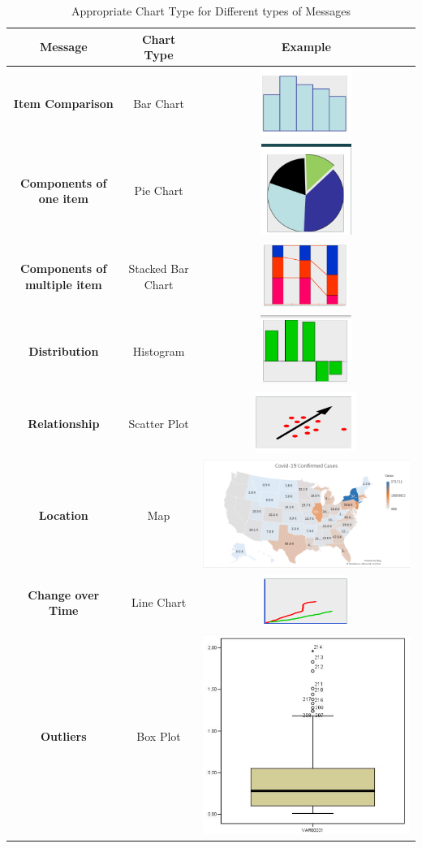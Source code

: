 \documentclass[11pt,fleqn]{book} %
\begin{document}
\begin{example}
\begin{table}[htb!]
  \centering
  \begin{tabular}{|c|c|c|}
    \hline
    \textbf{Message} & \textbf{Chart Type} & \textbf{Example} \\
    \hline
    \textbf{Item Comparison} & Bar Chart
    & \includegraphics[width=0.1\linewidth]{Pictures/small-bar.png} \\
    \hline
    \textbf{Components of one item} & Pie Chart
    & \includegraphics[width=0.1\linewidth]{Pictures/small-pie.png} \\
    \hline
    \textbf{Components of multiple item} & Stacked Bar Chart
    & \includegraphics[width=0.1\linewidth]{Pictures/small-stacked-bar.png} \\
    \hline
    \textbf{Distribution} & Histogram
    & \includegraphics[width=0.1\linewidth]{Pictures/small-histogram.png} \\
    \hline
    \textbf{Relationship} & Scatter Plot
    & \includegraphics[width=0.1\linewidth]{Pictures/small-scatter.png} \\
    \hline
    \textbf{Location} & Map
    & \includegraphics[width=0.1\linewidth]{Pictures/small-map.png} \\
    \hline
    \textbf{Change over Time} & Line Chart
    & \includegraphics[width=0.1\linewidth]{Pictures/small-line.png} \\
    \hline
    \textbf{Outliers} & Box Plot
    & \includegraphics[width=0.1\linewidth]{Pictures/small-box.png} \\
    \hline
  \end{tabular}
  \caption{Appropriate Chart Type for Different types of Messages}
  \label{tab:chart-type}
\end{table}


\end{example}
\end{document}
